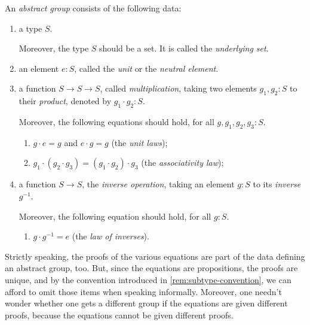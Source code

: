 \begin{definition}\label{def:abstractgroup}
  An \emph{abstract group} consists of the following data:
  \begin{enumerate}
  \item\label{struc:under-set} a type $S$.
    \par \noindent
    Moreover, the type $S$ should be a set.  It is called the \emph{underlying set}.
  \item\label{struc:unit} an element $e:S$, called the \emph{unit} or the \emph{neutral element}.
  \item\label{struc:mult-op} a function $S\to S\to S$, called \emph{multiplication},
    taking two elements $g_1,g_2:S$ to their \emph{product}, denoted by $g_1\cdot g_2:S$.
    \par \noindent
    Moreover, the following equations should hold, for all $g,g_1,g_2,g_3 : S$.
    \begin{enumerate}[label=(\alph*),ref=\ref{struc:mult-op} (\alph*)]
    \item\label{axiom:unit-laws} $g\cdot e=g$ and $e\cdot g=g$ (the \emph{unit laws});
    \item\label{axiom:ass-law} $g_1\cdot(g_2\cdot g_3)=(g_1\cdot g_2)\cdot g_3$ (the \emph{associativity law});
    \end{enumerate}
  \item\label{struc:inv-op} a function $S\to S$, the \emph{inverse operation},
    taking an element $g:S$ to its \emph{inverse} $g^{-1}$.
    \par \noindent
    Moreover, the following equation should hold, for all $g:S$.
    \begin{enumerate}[label=(\alph*),ref=\ref{struc:inv-op} (\alph*)]
    \item\label{axiom:inv-law} $ g\cdot g^{-1} = e$ (the \emph{law of inverses}).
    \qedhere
    \end{enumerate}
  \end{enumerate}
\end{definition}

\begin{remark}
  Strictly speaking, the proofs of the various equations are part of the data defining an abstract group, too.  But, since the equations are
  propositions, the proofs are unique, and by the convention introduced in \cref{rem:subtype-convention}, we can afford to omit those items when
  speaking informally.  Moreover, one needn't wonder whether one gets a different group if the equations are given different proofs, because the
  equations cannot be given different proofs.
\end{remark}

